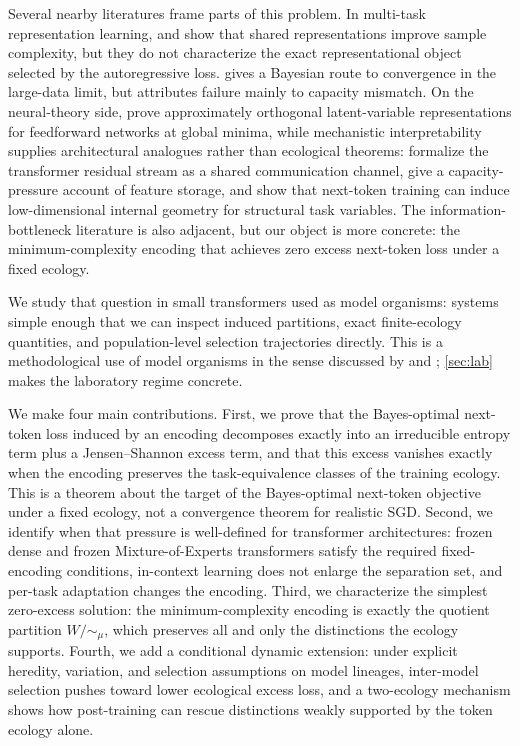 \documentclass[twoside,11pt]{article}
\begin{document}
Several nearby literatures frame parts of this problem. In multi-task representation learning, \citet{baxter_2000} and \citet{maurer_etal_2016} show that shared representations improve sample complexity, but they do not characterize the exact representational object selected by the autoregressive loss. \citet{lobashev_2025} gives a Bayesian route to convergence in the large-data limit, but attributes failure mainly to capacity mismatch. On the neural-theory side, \citet{wang_johnston_fusi_2025} prove approximately orthogonal latent-variable representations for feedforward networks at global minima, while mechanistic interpretability supplies architectural analogues rather than ecological theorems: \citet{elhage_etal_2021_framework} formalize the transformer residual stream as a shared communication channel, \citet{elhage_etal_2022_superposition} give a capacity-pressure account of feature storage, and \citet{gurnee_etal_2025_linebreaks} show that next-token training can induce low-dimensional internal geometry for structural task variables. The information-bottleneck literature \citep{tishby_etal_1999} is also adjacent, but our object is more concrete: the minimum-complexity encoding that achieves zero excess next-token loss under a fixed ecology.

We study that question in small transformers used as model organisms: systems simple enough that we can inspect induced partitions, exact finite-ecology quantities, and population-level selection trajectories directly. This is a methodological use of model organisms in the sense discussed by \citet{hubinger_etal_2024} and \citet{paez_2024}; \cref{sec:lab} makes the laboratory regime concrete.

We make four main contributions. First, we prove that the Bayes-optimal next-token loss induced by an encoding decomposes exactly into an irreducible entropy term plus a Jensen--Shannon excess term, and that this excess vanishes exactly when the encoding preserves the task-equivalence classes of the training ecology. This is a theorem about the target of the Bayes-optimal next-token objective under a fixed ecology, not a convergence theorem for realistic SGD. Second, we identify when that pressure is well-defined for transformer architectures: frozen dense and frozen Mixture-of-Experts transformers satisfy the required fixed-encoding conditions, in-context learning does not enlarge the separation set, and per-task adaptation changes the encoding. Third, we characterize the simplest zero-excess solution: the minimum-complexity encoding is exactly the quotient partition $W/{\sim_\mu}$, which preserves all and only the distinctions the ecology supports. Fourth, we add a conditional dynamic extension: under explicit heredity, variation, and selection assumptions on model lineages, inter-model selection pushes toward lower ecological excess loss, and a two-ecology mechanism shows how post-training can rescue distinctions weakly supported by the token ecology alone.
\end{document}
